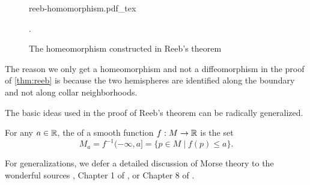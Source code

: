 \begin{figure}[ht]
	\centering
	{reeb-homomorphism.pdf_tex}
	\caption{The homeomorphism constructed in Reeb's theorem}.
\end{figure}

\begin{remark}
	The reason we only get a homeomorphism and not a diffeomorphism in the proof of \cref{thm:reeb} is because the two hemispheres are identified along the boundary and not along collar neighborhoods.
\end{remark}

The basic ideas used in the proof of Reeb's theorem can be radically generalized.

\begin{definition}
	For any $a\in \mathbb{R}$, the  of a smooth function $f : M \to \mathbb{R}$ is the set
	\begin{equation}
		M_a = f^{-1}(-\infty, a] = \{ p\in M \mid f(p)\leq a\}.
	\end{equation}
\end{definition}

For generalizations, we defer a detailed discussion of Morse theory to the wonderful sources \cite{milnor1963morse}, Chapter 1 of \cite{scorpan2005wild}, or Chapter 8 of \cite{hirsch1976differential}.

%
%
